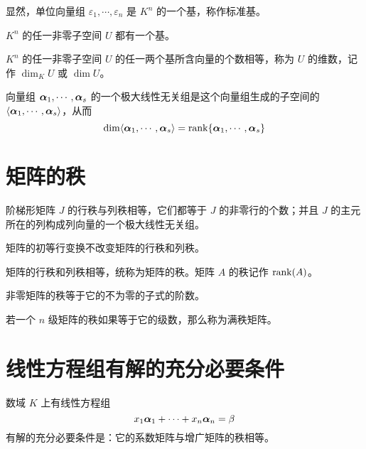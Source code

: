 显然，单位向量组 $\varepsilon_1,\cdots,\varepsilon_n$ 是 $K^n$ 的一个基，称作标准基。

\begin{theorem}
	$K^n$ 的任一非零子空间 $U$ 都有一个基。
\end{theorem}

\begin{theorem}
	$K^n$ 的任一非零子空间 $U$ 的任一两个基所含向量的个数相等，称为 $U$ 的维数，记作 $\dim_KU$ 或 $\dim U$。
\end{theorem}

\begin{theorem}
	向量组 $\boldsymbol{\alpha}_1,\cdots,\boldsymbol{\alpha}_s$ 的一个极大线性无关组是这个向量组生成的子空间的 $\langle \boldsymbol{\alpha}_1,\cdots,\boldsymbol{\alpha}_s \rangle$，从而
	$$\dim\langle \boldsymbol{\alpha}_1,\cdots,\boldsymbol{\alpha}_s \rangle = \operatorname{rank}\{\boldsymbol{\alpha}_1,\cdots,\boldsymbol{\alpha}_s\}$$
\end{theorem}

\section{矩阵的秩}

\begin{theorem}
	阶梯形矩阵 $J$ 的行秩与列秩相等，它们都等于 $J$ 的非零行的个数；并且 $J$ 的主元所在的列构成列向量的一个极大线性无关组。
\end{theorem}

\begin{theorem}
	矩阵的初等行变换不改变矩阵的行秩和列秩。
\end{theorem}

\begin{theorem}
	矩阵的行秩和列秩相等，统称为矩阵的秩。矩阵 $A$ 的秩记作 $\operatorname{rank}(A)$。
\end{theorem}

\begin{theorem}
	非零矩阵的秩等于它的不为零的子式的阶数。
\end{theorem}

若一个 $n$ 级矩阵的秩如果等于它的级数，那么称为满秩矩阵。

\section{线性方程组有解的充分必要条件}

\begin{theorem}
	数域 $K$ 上有线性方程组
	$$x_1\boldsymbol{\alpha}_1 + \cdots + x_n\boldsymbol{\alpha}_n = \beta$$
	有解的充分必要条件是：它的系数矩阵与增广矩阵的秩相等。
\end{theorem}

